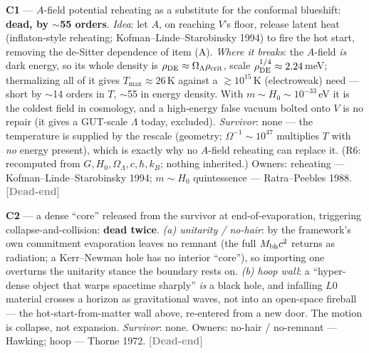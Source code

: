\documentclass[11pt]{article}
\newcommand{\dead}{\textcolor{gray}{\textbf{[Dead-end]}}}
\begin{document}
\textbf{C1} --- $A$-field potential reheating as a substitute for the conformal blueshift: \textbf{dead, by $\sim$55 orders}. \emph{Idea}: let $A$, on reaching $V$'s floor, release latent heat (inflaton-style reheating; Kofman--Linde--Starobinsky 1994) to fire the hot start, removing the de-Sitter dependence of item (A). \emph{Where it breaks}: the $A$-field \emph{is} dark energy, so its whole density is $\rho_{\rm DE}\approx\Omega_\Lambda\rho_{\rm crit}$, scale $\rho_{\rm DE}^{1/4}\approx2.24$\,meV; thermalizing all of it gives $T_{\max}\approx26$\,K against a $\gtrsim10^{15}$\,K (electroweak) need --- short by $\sim$14 orders in $T$, $\sim$55 in energy density. With $m\sim H_0\sim10^{-33}$\,eV it is the coldest field in cosmology, and a high-energy false vacuum bolted onto $V$ is no repair (it gives a GUT-scale $\Lambda$ today, excluded). \emph{Survivor}: none --- the temperature is supplied by the rescale (geometry; $\Omega^{-1}\sim10^{47}$ multiplies $T$ with \emph{no} energy present), which is exactly why no $A$-field reheating can replace it. (R6: recomputed from $G,H_0,\Omega_\Lambda,c,\hbar,k_B$; nothing inherited.) Owners: reheating --- Kofman--Linde--Starobinsky 1994; $m\sim H_0$ quintessence --- Ratra--Peebles 1988. \dead\quad

\textbf{C2} --- a dense ``core'' released from the survivor at end-of-evaporation, triggering collapse-and-collision: \textbf{dead twice}. \emph{(a) unitarity / no-hair}: by the framework's own commitment evaporation leaves no remnant (the full $M_{\rm bh}c^2$ returns as radiation; a Kerr--Newman hole has no interior ``core''), so importing one overturns the unitarity stance the boundary rests on. \emph{(b) hoop wall}: a ``hyper-dense object that warps spacetime sharply'' \emph{is} a black hole, and infalling $L0$ material crosses a horizon as gravitational waves, not into an open-space fireball --- the hot-start-from-matter wall above, re-entered from a new door. The motion is collapse, not expansion. \emph{Survivor}: none. Owners: no-hair / no-remnant --- Hawking; hoop --- Thorne 1972. \dead\quad
\end{document}
